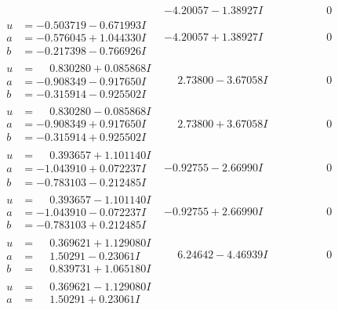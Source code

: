 \documentclass[1p]{elsarticle_modified}
\theoremstyle{definition}
\begin{document}
$$\begin{array}{c|c|c}
 & -4.20057 - 1.38927 I & \phantom{-0.000000 } 0 \\ \hline\begin{aligned}
u &= -0.503719 - 0.671993 I \\
a &= -0.576045 + 1.044330 I \\
b &= -0.217398 - 0.766926 I\end{aligned}
 & -4.20057 + 1.38927 I & \phantom{-0.000000 } 0 \\ \hline\begin{aligned}
u &= \phantom{-}0.830280 + 0.085868 I \\
a &= -0.908349 - 0.917650 I \\
b &= -0.315914 - 0.925502 I\end{aligned}
 & \phantom{-}2.73800 - 3.67058 I & \phantom{-0.000000 } 0 \\ \hline\begin{aligned}
u &= \phantom{-}0.830280 - 0.085868 I \\
a &= -0.908349 + 0.917650 I \\
b &= -0.315914 + 0.925502 I\end{aligned}
 & \phantom{-}2.73800 + 3.67058 I & \phantom{-0.000000 } 0 \\ \hline\begin{aligned}
u &= \phantom{-}0.393657 + 1.101140 I \\
a &= -1.043910 + 0.072237 I \\
b &= -0.783103 - 0.212485 I\end{aligned}
 & -0.92755 - 2.66990 I & \phantom{-0.000000 } 0 \\ \hline\begin{aligned}
u &= \phantom{-}0.393657 - 1.101140 I \\
a &= -1.043910 - 0.072237 I \\
b &= -0.783103 + 0.212485 I\end{aligned}
 & -0.92755 + 2.66990 I & \phantom{-0.000000 } 0 \\ \hline\begin{aligned}
u &= \phantom{-}0.369621 + 1.129080 I \\
a &= \phantom{-}1.50291 - 0.23061 I \\
b &= \phantom{-}0.839731 + 1.065180 I\end{aligned}
 & \phantom{-}6.24642 - 4.46939 I & \phantom{-0.000000 } 0 \\ \hline\begin{aligned}
u &= \phantom{-}0.369621 - 1.129080 I \\
a &= \phantom{-}1.50291 + 0.23061 I \\

\end{aligned}
\end{array}$$
\end{document}
